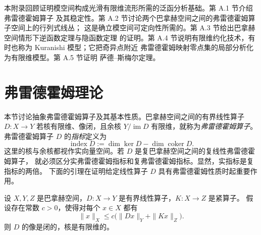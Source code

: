 
本附录回顾证明模空间构成光滑有限维流形所需的泛函分析基础。第 A.1 节介绍弗雷德霍姆算子
及其稳定性。第 A.2 节讨论两个巴拿赫空间之间的弗雷德霍姆算子空间上的行列式线丛；
这是确立模空间可定向性所需的。第 A.3 节给出巴拿赫空间情形下逆函数定理与隐函数定理
的证明。第 A.4 节说明有限维约化技术，有时也称为 Kuranishi 模型；它把奇异点附近
弗雷德霍姆映射零点集的局部分析化为有限维模型。第 A.5 节证明 萨德--斯梅尔定理。

\section{弗雷德霍姆理论}\label{sec:A-1}

本节讨论抽象弗雷德霍姆算子及其基本性质。巴拿赫空间之间的有界线性算子 $D:X\to Y$
若核有限维、像闭，且余核 $Y/\operatorname{im}D$ 有限维，就称为\emph{弗雷德霍姆算子}。
弗雷德霍姆算子 $D$ 的\emph{指标}定义为
\[
  \operatorname{index}D:=\dim\ker D-\dim\operatorname{coker}D.
\]
这里的核与余核都视作实向量空间。若 $D$ 是复巴拿赫空间之间的复线性弗雷德霍姆算子，
就必须区分实弗雷德霍姆指标和复弗雷德霍姆指标。显然，实指标是复指标的两倍。
下面的引理在证明给定线性算子 $D$ 具有弗雷德霍姆性质时起重要作用。

\begin{lemma}\label{lem:A-1-1}
设 $X,Y,Z$ 是巴拿赫空间，$D:X\to Y$ 是有界线性算子，$K:X\to Z$ 是紧算子。
假设存在常数 $c>0$，使得对每个 $x\in X$ 都有
\begin{equation}\label{eq:A-1-1}
  \|x\|_X\le c\bigl(\|Dx\|_Y+\|Kx\|_Z\bigr).
\end{equation}
则 $D$ 的像是闭的，核是有限维的。
\end{lemma}


